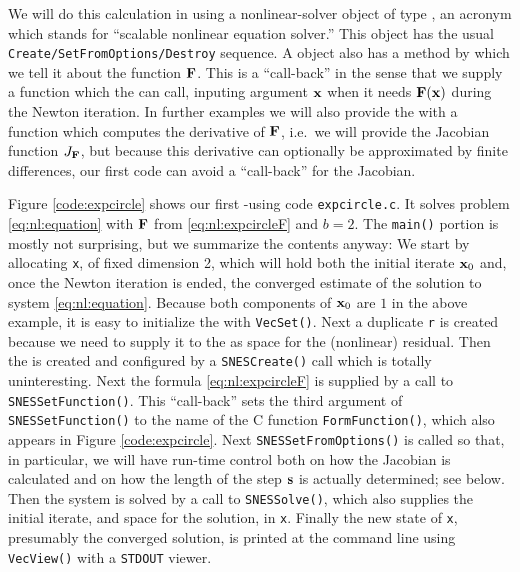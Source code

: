 We will do this calculation in \PETSc using a nonlinear-solver object of type \pSNES, an acronym which stands for ``scalable nonlinear equation solver.''  This object has the usual \texttt{Create/SetFromOptions/Destroy} sequence.  A \pSNES object also has a method by which we tell it about the function $\mathbf{F}$.  This is a ``call-back'' in the sense that we supply a function which the \pSNES can call, inputing argument $\mathbf{x}$ when it needs $\mathbf{F}(\mathbf{x})$ during the Newton iteration.  In further examples we will also provide the \pSNES with a function which computes the derivative of $\mathbf{F}$, i.e.~we will provide the Jacobian function $J_{\mathbf{F}}$, but because this derivative can optionally be approximated by finite differences, our first code can avoid a ``call-back'' for the Jacobian.

Figure \ref{code:expcircle} shows our first \pSNES-using code \texttt{expcircle.c}.  It solves problem \eqref{eq:nl:equation} with $\mathbf{F}$ from \eqref{eq:nl:expcircleF} and $b=2$.  The \texttt{main()} portion is mostly not surprising, but we summarize the contents anyway:  We start by allocating \pVec \texttt{x}, of fixed dimension 2, which will hold both the initial iterate $\mathbf{x}_0$ and, once the Newton iteration is ended, the converged estimate of the solution to system \eqref{eq:nl:equation}.  Because both components of $\mathbf{x}_0$ are $1$ in the above example, it is easy to initialize the \pVec with \texttt{VecSet()}.  Next a duplicate \pVec \texttt{r} is created because we need to supply it to the \pSNES as space for the (nonlinear) residual.  Then the \pSNES is created and configured by a \texttt{SNESCreate()} call which is totally uninteresting.  Next the formula \eqref{eq:nl:expcircleF} is supplied by a call to \texttt{SNESSetFunction()}.  This ``call-back'' sets the third argument of \texttt{SNESSetFunction()} to the name of the C function \texttt{FormFunction()}, which also appears in Figure \ref{code:expcircle}.  Next \texttt{SNESSetFromOptions()} is called so that, in particular, we will have run-time control both on how the Jacobian is calculated and on how the length of the step $\mathbf{s}$ is actually determined; see below.  Then the system is solved by a call to \texttt{SNESSolve()}, which also supplies the initial iterate, and space for the solution, in \texttt{x}.  Finally the new state of \texttt{x}, presumably the converged solution, is printed at the command line using \texttt{VecView()} with a \texttt{STDOUT} viewer.

\vfill
{}

